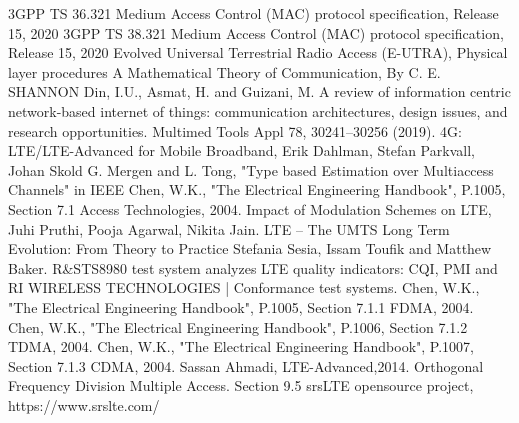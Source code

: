 \begin{thebibliography}{9}
3GPP TS 36.321 Medium Access Control (MAC) protocol specification, Release 15, 2020
3GPP TS 38.321 Medium Access Control (MAC) protocol specification, Release 15, 2020
Evolved Universal Terrestrial Radio Access (E-UTRA), Physical layer procedures 
A Mathematical Theory of Communication, By C. E. SHANNON
Din, I.U., Asmat, H. and Guizani, M. A review of information centric network-based internet of things: communication architectures, design issues, and research opportunities. Multimed Tools Appl 78, 30241–30256 (2019). 
4G: LTE/LTE-Advanced for Mobile Broadband, Erik Dahlman, Stefan Parkvall, Johan Skold
G. Mergen and L. Tong, "Type based Estimation over Multiaccess Channels" in IEEE 
Chen, W.K., "The Electrical Engineering Handbook", P.1005, Section 7.1 Access Technologies, 2004.
Impact of Modulation Schemes on LTE, Juhi Pruthi, Pooja Agarwal, Nikita Jain.
LTE – The UMTS Long Term Evolution: From Theory to Practice Stefania Sesia, Issam Toufik and Matthew Baker.
R\&STS8980 test system analyzes LTE quality indicators: CQI, PMI and RI
WIRELESS TECHNOLOGIES | Conformance test systems. 
Chen, W.K., "The Electrical Engineering Handbook", P.1005, Section 7.1.1 FDMA, 2004. 
Chen, W.K., "The Electrical Engineering Handbook", P.1006, Section 7.1.2 TDMA, 2004.
Chen, W.K., "The Electrical Engineering Handbook", P.1007, Section 7.1.3 CDMA, 2004.
Sassan Ahmadi, LTE-Advanced,2014. Orthogonal Frequency Division Multiple Access. Section 9.5
srsLTE opensource project, https://www.srslte.com/ 
\end{thebibliography}